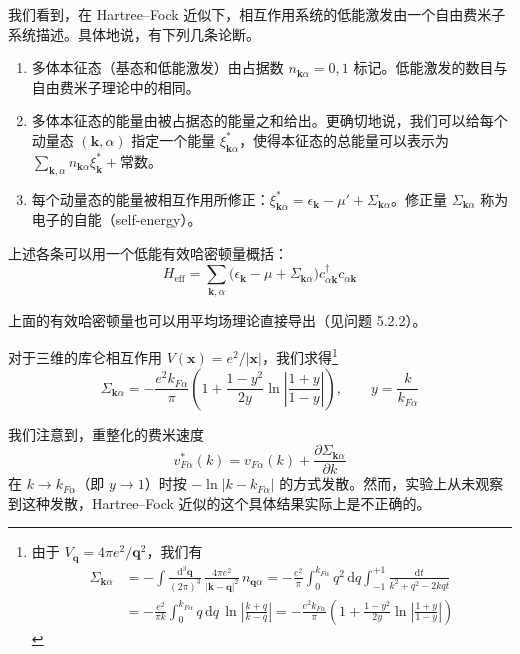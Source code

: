 我们看到，在 Hartree--Fock 近似下，相互作用系统的低能激发由一个自由费米子系统描述。具体地说，有下列几条论断。

\begin{enumerate}
\item 多体本征态（基态和低能激发）由占据数 $n_{\pmb{k}\alpha}=0,1$ 标记。低能激发的数目与自由费米子理论中的相同。
\item 多体本征态的能量由被占据态的能量之和给出。更确切地说，我们可以给每个动量态 $(\pmb{k},\alpha)$ 指定一个能量 $\xi^{*}_{\pmb{k}\alpha}$，使得本征态的总能量可以表示为 $\sum_{\pmb{k},\alpha} n_{\pmb{k}\alpha}\xi^{*}_{\pmb{k}} + \text{常数}$。
\item 每个动量态的能量被相互作用所修正：$\xi^{*}_{\pmb{k}\alpha} = \epsilon_{\pmb{k}} - \mu' + \Sigma_{\pmb{k}\alpha}$。修正量 $\Sigma_{\pmb{k}\alpha}$ 称为电子的自能（self-energy）。
\end{enumerate}

上述各条可以用一个低能有效哈密顿量概括：
\begin{equation*}
H_{\mathrm{eff}} = \sum_{\pmb{k},\alpha} \big( \epsilon_{\pmb{k}} - \mu + \Sigma_{\pmb{k}\alpha} \big) c^{\dagger}_{\alpha\pmb{k}} c_{\alpha\pmb{k}} \tag{5.2.7}
\end{equation*}

上面的有效哈密顿量也可以用平均场理论直接导出（见问题 5.2.2）。

对于三维的库仑相互作用 $V(\pmb{x}) = e^{2}/|\pmb{x}|$，我们求得\footnote{由于 $V_{\pmb{q}} = 4\pi e^{2}/\pmb{q}^{2}$，我们有
\begin{align*}
\Sigma_{\pmb{k}\alpha} &= -\int \frac{\mathrm{d}^{3}\pmb{q}}{(2\pi)^{3}}\, \frac{4\pi e^{2}}{|\pmb{k}-\pmb{q}|^{2}}\, n_{\pmb{q}\alpha} = -\frac{e^{2}}{\pi} \int_{0}^{k_{F\alpha}} q^{2}\,\mathrm{d}q \int_{-1}^{+1} \frac{\mathrm{d}t}{k^{2}+q^{2}-2kqt}\\
&= -\frac{e^{2}}{\pi k} \int_{0}^{k_{F\alpha}} q\,\mathrm{d}q\, \ln\left| \frac{k+q}{k-q} \right| = -\frac{e^{2}k_{F\alpha}}{\pi} \left( 1 + \frac{1-y^{2}}{2y} \ln\left| \frac{1+y}{1-y} \right| \right)
\end{align*}}
\begin{equation*}
\Sigma_{\pmb{k}\alpha} = -\frac{e^{2}k_{F\alpha}}{\pi} \left( 1 + \frac{1-y^{2}}{2y} \ln\left| \frac{1+y}{1-y} \right| \right), \qquad y = \frac{k}{k_{F\alpha}} \tag{5.2.8}
\end{equation*}

我们注意到，重整化的费米速度
\begin{equation*}
v^{*}_{F\alpha}(k) = v_{F\alpha}(k) + \frac{\partial \Sigma_{\pmb{k}\alpha}}{\partial k}
\end{equation*}
在 $k \to k_{F\alpha}$（即 $y \to 1$）时按 $-\ln|k - k_{F\alpha}|$ 的方式发散。然而，实验上从未观察到这种发散，Hartree--Fock 近似的这个具体结果实际上是不正确的。

